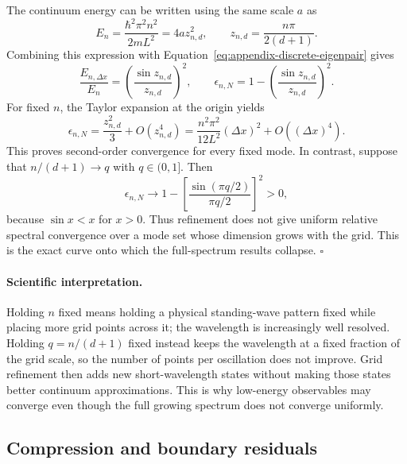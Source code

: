 \documentclass[11pt]{article}
\begin{document}
The continuum energy can be written using the same scale $a$ as
\begin{equation}
 E_n
 =\frac{\hbar^2\pi^2n^2}{2mL^2}
 =4a z_{n,d}^2,
 \qquad
 z_{n,d}=\frac{n\pi}{2(d+1)}.
\end{equation}
Combining this expression with Equation~\eqref{eq:appendix-discrete-eigenpair} gives
\begin{equation}
 \frac{E_{n,\Delta x}}{E_n}
 =\left(\frac{\sin z_{n,d}}{z_{n,d}}\right)^2,
 \qquad
 \epsilon_{n,N}
 =1-\left(\frac{\sin z_{n,d}}{z_{n,d}}\right)^2.
 \label{eq:appendix-exact-dispersion-error}
\end{equation}
For fixed $n$, the Taylor expansion at the origin yields
\begin{equation}
 \epsilon_{n,N}
 =\frac{z_{n,d}^2}{3}+O(z_{n,d}^4)
 =\frac{n^2\pi^2}{12L^2}(\Delta x)^2+O((\Delta x)^4).
 \label{eq:appendix-fixed-mode-order}
\end{equation}
This proves second-order convergence for every fixed mode. In contrast, suppose that
$n/(d+1)\to q$ with $q\in(0,1]$. Then
\begin{equation}
 \epsilon_{n,N}\longrightarrow
 1-\left[
 \frac{\sin(\pi q/2)}{\pi q/2}
 \right]^2>0,
 \label{eq:appendix-fractional-mode-limit}
\end{equation}
because $\sin x<x$ for $x>0$. Thus refinement does not give uniform relative spectral
convergence over a mode set whose dimension grows with the grid. This is the exact
curve onto which the full-spectrum results collapse.
\hfill$\square$

\paragraph{Scientific interpretation.}
Holding $n$ fixed means holding a physical standing-wave pattern fixed while placing
more grid points across it; the wavelength is increasingly well resolved. Holding
$q=n/(d+1)$ fixed instead keeps the wavelength at a fixed fraction of the grid scale,
so the number of points per oscillation does not improve. Grid refinement then adds
new short-wavelength states without making those states better continuum
approximations. This is why low-energy observables may converge even though the full
growing spectrum does not converge uniformly.

\subsection{Compression and boundary residuals}
\end{document}
